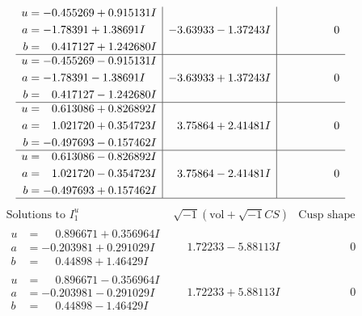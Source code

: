 \documentclass[1p]{elsarticle_modified}
\theoremstyle{definition}
\newcommand{\I}{\sqrt{-1}}
\begin{document}
$$\begin{array}{c|c|c}
\begin{aligned}
u &= -0.455269 + 0.915131 I \\
a &= -1.78391 + 1.38691 I \\
b &= \phantom{-}0.417127 + 1.242680 I\end{aligned}
 & -3.63933 - 1.37243 I & \phantom{-0.000000 } 0 \\ \hline\begin{aligned}
u &= -0.455269 - 0.915131 I \\
a &= -1.78391 - 1.38691 I \\
b &= \phantom{-}0.417127 - 1.242680 I\end{aligned}
 & -3.63933 + 1.37243 I & \phantom{-0.000000 } 0 \\ \hline\begin{aligned}
u &= \phantom{-}0.613086 + 0.826892 I \\
a &= \phantom{-}1.021720 + 0.354723 I \\
b &= -0.497693 - 0.157462 I\end{aligned}
 & \phantom{-}3.75864 + 2.41481 I & \phantom{-0.000000 } 0 \\ \hline\begin{aligned}
u &= \phantom{-}0.613086 - 0.826892 I \\
a &= \phantom{-}1.021720 - 0.354723 I \\
b &= -0.497693 + 0.157462 I\end{aligned}
 & \phantom{-}3.75864 - 2.41481 I & \phantom{-0.000000 } 0\\
 \hline 
 \end{array}$$\newpage$$\begin{array}{c|c|c}  
\text{Solutions to }I^u_{1}& \I (\text{vol} + \sqrt{-1}CS) & \text{Cusp shape}\\
 \hline 
\begin{aligned}
u &= \phantom{-}0.896671 + 0.356964 I \\
a &= -0.203981 + 0.291029 I \\
b &= \phantom{-}0.44898 + 1.46429 I\end{aligned}
 & \phantom{-}1.72233 - 5.88113 I & \phantom{-0.000000 } 0 \\ \hline\begin{aligned}
u &= \phantom{-}0.896671 - 0.356964 I \\
a &= -0.203981 - 0.291029 I \\
b &= \phantom{-}0.44898 - 1.46429 I\end{aligned}
 & \phantom{-}1.72233 + 5.88113 I & \phantom{-0.000000 } 0 \\ \hline\begin{aligned}

\end{aligned}
\end{array}$$
\end{document}
